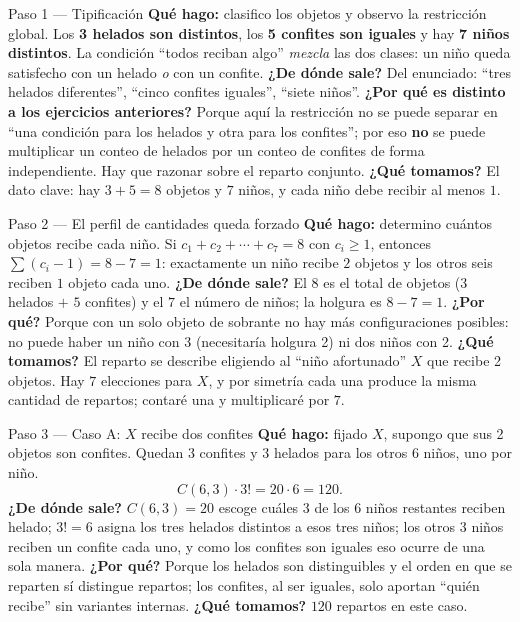 \documentclass[11pt]{article}
\begin{document}
\begin{paso}{Paso 1 --- Tipificación}
\textbf{Qué hago:} clasifico los objetos y observo la restricción global.
Los \textbf{3 helados son distintos}, los \textbf{5 confites son iguales} y hay \textbf{7 niños distintos}. La condición ``todos reciban algo'' \emph{mezcla} las dos clases: un niño queda satisfecho con un helado \emph{o} con un confite.
\textbf{¿De dónde sale?} Del enunciado: ``tres helados diferentes'', ``cinco confites iguales'', ``siete niños''.
\textbf{¿Por qué es distinto a los ejercicios anteriores?} Porque aquí la restricción no se puede separar en ``una condición para los helados y otra para los confites''; por eso \textbf{no} se puede multiplicar un conteo de helados por un conteo de confites de forma independiente. Hay que razonar sobre el reparto conjunto.
\textbf{¿Qué tomamos?} El dato clave: hay $3+5=8$ objetos y $7$ niños, y cada niño debe recibir al menos $1$.
\end{paso}

\begin{paso}{Paso 2 --- El perfil de cantidades queda forzado}
\textbf{Qué hago:} determino cuántos objetos recibe cada niño.
Si $c_1+c_2+\cdots+c_7=8$ con $c_i\ge 1$, entonces $\sum (c_i-1)=8-7=1$: exactamente un niño recibe $2$ objetos y los otros seis reciben $1$ objeto cada uno.
\textbf{¿De dónde sale?} El $8$ es el total de objetos ($3$ helados $+$ $5$ confites) y el $7$ el número de niños; la holgura es $8-7=1$.
\textbf{¿Por qué?} Porque con un solo objeto de sobrante no hay más configuraciones posibles: no puede haber un niño con 3 (necesitaría holgura 2) ni dos niños con 2.
\textbf{¿Qué tomamos?} El reparto se describe eligiendo al ``niño afortunado'' $X$ que recibe 2 objetos. Hay $7$ elecciones para $X$, y por simetría cada una produce la misma cantidad de repartos; contaré una y multiplicaré por $7$.
\end{paso}

\begin{paso}{Paso 3 --- Caso A: $X$ recibe dos confites}
\textbf{Qué hago:} fijado $X$, supongo que sus 2 objetos son confites. Quedan $3$ confites y $3$ helados para los otros $6$ niños, uno por niño.
\[
C(6,3)\cdot 3!=20\cdot 6=120 .
\]
\textbf{¿De dónde sale?} $C(6,3)=20$ escoge cuáles $3$ de los $6$ niños restantes reciben helado; $3!=6$ asigna los tres helados distintos a esos tres niños; los otros $3$ niños reciben un confite cada uno, y como los confites son iguales eso ocurre de una sola manera.
\textbf{¿Por qué?} Porque los helados son distinguibles y el orden en que se reparten sí distingue repartos; los confites, al ser iguales, solo aportan ``quién recibe'' sin variantes internas.
\textbf{¿Qué tomamos?} $120$ repartos en este caso.
\end{paso}
\end{document}
